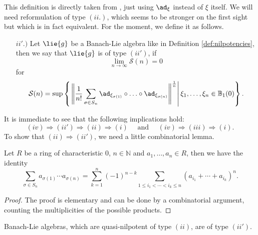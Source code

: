 \documentclass[
11pt,                          %
english                        %
]{article}
\begin{document}
This definition is directly taken from \cite{mueller:1994a}, just using $\ad_\xi$ 
instead of $\xi$ itself. We will need reformulation of type $(ii.)$, which seems to 
be stronger on the first sight but which is in fact equivalent. For the moment, we 
define it as follows.
\begin{itemize}
	\item[$ii'.)$]
	Let $\lie{g}$ be a Banach-Lie algebra like in Definition 
	\ref{def:nilpotencies}, then we say that $\lie{g}$ is of type $(ii')$, if
	\begin{equation*}
		\lim_{n \longrightarrow \infty}
		\mathcal{S}(n)
		=
		0
	\end{equation*}
	for
	\begin{equation}
		\mathcal{S}(n)
		=
		\sup \left\{ 
		\left.
			\left\Vert
				\frac{1}{n!}
				\sum\limits_{\sigma \in S_n}
				\ad_{\xi_{\sigma(1)}} \circ \ldots \circ \ad_{\xi_{\sigma(n)}}
			\right\Vert^{\frac{1}{n}} 
		\right|
			\xi_1, \ldots, \xi_n \in \mathbb{B}_1(0)
		\right\}.
	\end{equation}
\end{itemize}
It is immediate to see that the following implications hold:
\begin{equation*}
	(iv) \Longrightarrow 
	(ii') \Longrightarrow 
	(ii) \Longrightarrow 
	(i)
	\quad \text{ and } \quad
	(iv) \Longrightarrow
	(iii) \Longrightarrow 
	(i).
\end{equation*}
To show that $(ii) \Longrightarrow (ii')$, we need a little combinatorial lemma.
\begin{lemma}
	\label{lemma:symmetric-to-power}
	Let $R$ be a ring of characteristic $0$, $n\in \mathbb{N}$ and $a_1, 
	\ldots, a_n \in R$, then we have the identity
	\begin{equation*}
		\sum\limits_{\sigma \in S_n}
		a_{\sigma(1)} \cdots a_{\sigma(n)}
		=
		\sum\limits_{k = 1}^n
		(-1)^{n-k}
		\sum\limits_{1 \leq i_1 < \cdots < i_k \leq n}
		(a_{i_1} + \cdots + a_{i_k})^n.
	\end{equation*}
\end{lemma}
\begin{proof}
	The proof is elementary and can be done by a combinatorial argument, counting 
	the multiplicities of the possible products.
\end{proof}
\begin{proposition}
	\label{prop:type-2-is-2prime}
	Banach-Lie algebras, which are quasi-nilpotent of type $(ii)$, are of type 
	$(ii')$.
\end{proposition}
\end{document}

